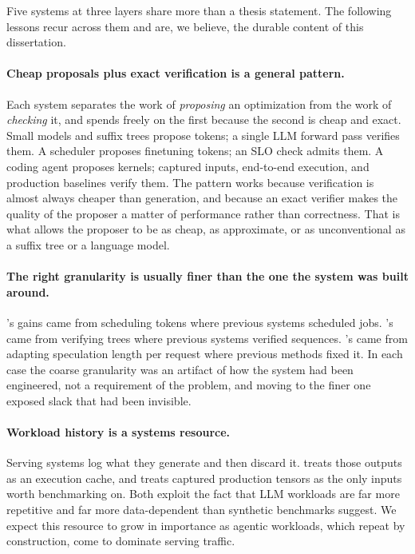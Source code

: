 Five systems at three layers share more than a thesis statement.
The following lessons recur across them and are, we believe, the durable content of this dissertation.

\paragraph{Cheap proposals plus exact verification is a general pattern.}
Each system separates the work of \emph{proposing} an optimization from the work of \emph{checking} it, and spends freely on the first because the second is cheap and exact.
Small models and suffix trees propose tokens; a single LLM forward pass verifies them.
A scheduler proposes finetuning tokens; an SLO check admits them.
A coding agent proposes kernels; captured inputs, end-to-end execution, and production baselines verify them.
The pattern works because verification is almost always cheaper than generation, and because an exact verifier makes the quality of the proposer a matter of performance rather than correctness.
That is what allows the proposer to be as cheap, as approximate, or as unconventional as a suffix tree or a language model.

\paragraph{The right granularity is usually finer than the one the system was built around.}
\FlexLLM's gains came from scheduling tokens where previous systems scheduled jobs.
\SpecInfer's came from verifying trees where previous systems verified sequences.
\SuffixDecoding's came from adapting speculation length per request where previous methods fixed it.
In each case the coarse granularity was an artifact of how the system had been engineered, not a requirement of the problem, and moving to the finer one exposed slack that had been invisible.

\paragraph{Workload history is a systems resource.}
Serving systems log what they generate and then discard it.
\SuffixDecoding treats those outputs as an execution cache, and \FastKernels treats captured production tensors as the only inputs worth benchmarking on.
Both exploit the fact that LLM workloads are far more repetitive and far more data-dependent than synthetic benchmarks suggest.
We expect this resource to grow in importance as agentic workloads, which repeat by construction, come to dominate serving traffic.

